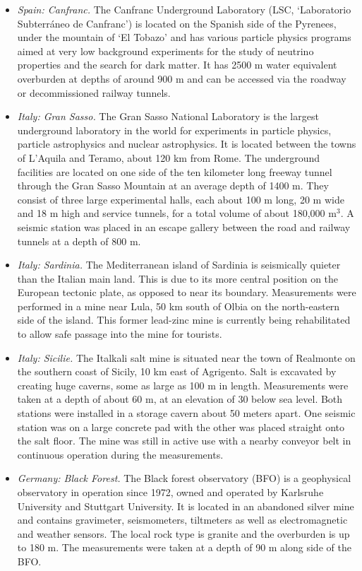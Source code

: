 \begin{itemize}
\item \emph{Spain: Canfranc.}
The Canfranc Underground Laboratory (LSC, `Laboratorio Subterr\'aneo de Canfranc') is located on the Spanish side of the Pyrenees, under the mountain of `El Tobazo' and has various particle physics programs aimed at very low background experiments for the study of neutrino properties and the search for dark matter. It has 2500 m water equivalent overburden at depths of around 900 m and can be accessed via the roadway or decommissioned railway tunnels.

\item \emph{Italy: Gran Sasso.}
The Gran Sasso National Laboratory is the largest underground laboratory in the world for experiments in particle physics, particle astrophysics and nuclear astrophysics. It is located between the towns of L'Aquila and Teramo, about 120 km from Rome. The underground facilities are located on one side of the ten kilometer long freeway tunnel through the Gran Sasso Mountain at an average depth of 1400 m. They consist of three large experimental halls, each about 100 m long, 20 m wide and 18 m high and service tunnels, for a total volume of about 180,000 m$^3$. A seismic station was placed in an escape gallery between the road and railway tunnels at a depth of 800 m.

\item \emph{Italy: Sardinia.}
The Mediterranean island of Sardinia is seismically quieter than the Italian main land. This is due to its more central position on the European tectonic plate, as opposed to near its boundary. Measurements were performed in a mine near Lula, 50 km south of Olbia on the north-eastern side of the island. This former lead-zinc mine is currently being rehabilitated to allow safe passage into the mine for tourists. 

\item \emph{Italy: Sicilie.}
The Italkali salt mine is situated near the town of Realmonte on the southern coast of Sicily, 10 km east of Agrigento. Salt is excavated by creating huge caverns, some as large as 100 m in length. Measurements were taken at a depth of about 60 m, at an elevation of 30 below sea level. Both stations were installed in a storage cavern about 50 meters apart. One seismic station was on a large concrete pad with the other was placed straight onto the salt floor. The mine was still in active use with a nearby conveyor belt in continuous operation during the measurements. 

\item \emph{Germany: Black Forest.}
The Black forest observatory (BFO) is a geophysical observatory in operation since 1972, owned and operated by Karlsruhe University and Stuttgart University. It is located in an abandoned silver mine and contains gravimeter, seismometers, tiltmeters as well as electromagnetic and weather sensors. The local rock type is granite and the overburden is up to 180 m. The measurements were taken at a depth of 90 m along side of the BFO.


\end{itemize}
